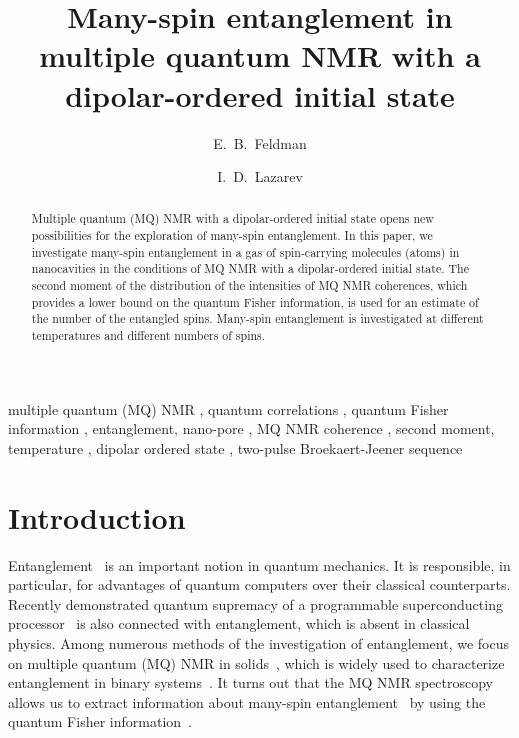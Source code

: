 \documentclass[review]{elsarticle}
\begin{document}
\begin{frontmatter}

\title{Many-spin entanglement in multiple quantum NMR with a dipolar-ordered initial state}

\author[icp]{E.~B.~Feldman}
\author[icp,msu]{I.~D.~Lazarev} %

\address[icp]{Institute of Problems of Chemical Physics of Russian Academy of Sciences, \\ Chernogolovka, Moscow Region, Russia 142432}
\address[msu]{Faculty of Fundamental Physical-Chemical Engineering, Lomonosov Moscow State University, GSP-1, Moscow, Russia 119991}



\begin{abstract}
Multiple quantum (MQ) NMR with a dipolar-ordered initial state opens new possibilities for the exploration of many-spin entanglement. 
In this paper, we investigate many-spin entanglement in a gas of spin-carrying molecules (atoms) in nanocavities 
in the conditions of MQ NMR with a dipolar-ordered initial state.
The second moment of the distribution of the intensities of MQ NMR coherences,
which provides a lower bound on the quantum Fisher information, 
is used for an estimate of the number of the entangled spins. 
Many-spin entanglement is investigated at different temperatures and different numbers of spins.
\end{abstract}

\begin{keyword}
multiple quantum (MQ) NMR \sep  
quantum correlations \sep 
quantum Fisher information \sep 
entanglement, nano-pore \sep 
MQ NMR coherence \sep 
second moment, temperature \sep 
dipolar ordered state \sep 
two-pulse Broekaert-Jeener sequence
\end{keyword}

\end{frontmatter}

\linenumbers

\section{Introduction}
\label{sec:1}

Entanglement~\cite{Nielsen_2009} is an important notion in quantum mechanics. It is responsible, in particular, for advantages of quantum computers over their classical counterparts.
Recently demonstrated quantum supremacy of a programmable superconducting processor~\cite{Arute2019} is also connected with entanglement, which is absent in classical physics.
Among numerous methods of the investigation of entanglement, we focus on multiple quantum (MQ) NMR in solids~\cite{Baum_1985}, which is widely used to characterize entanglement in binary systems~\cite{Furman_2008,Furman_2009,Fel_dman_2008,Fel_dman_2012}. 
It turns out that the MQ NMR spectroscopy~\cite{Baum_1985} allows us to extract information about many-spin entanglement~\cite{G_rttner_2018} by using the quantum Fisher information~\cite{T_th_2014,Pezz__2018}.
\end{document}
